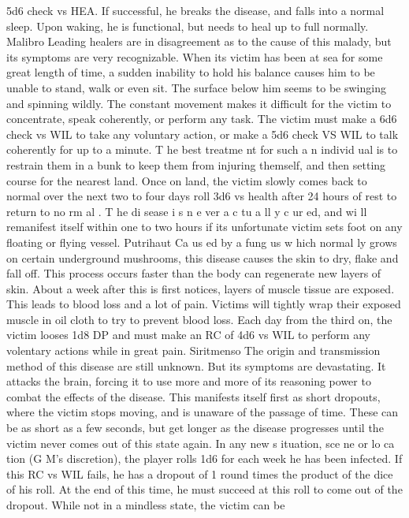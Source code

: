 \begin{multicols*}{2}
5d6 check vs HEA. If successful, he breaks the disease, and
falls into a normal sleep. Upon waking, he is functional, but
needs to heal up to full normally.
Malibro
Leading healers are in disagreement as to the cause
of this malady, but its symptoms are very recognizable. When
its victim has been at sea for some great length of time, a
sudden inability to hold his balance causes him to be unable
to stand, walk or even sit. The surface below him seems to be
swinging and spinning wildly. The constant movement makes
it difficult for the victim to concentrate, speak coherently, or
perform any task. The victim must make a 6d6 check vs WIL
to take any voluntary action, or make a 5d6 check VS WIL to
talk coherently for up to a minute.
T he best treatme nt for such a n individ ual is to
restrain them in a bunk to keep them from injuring themself,
and then setting course for the nearest land. Once on land, the
victim slowly comes back to normal over the next two to four
days roll 3d6 vs health after 24 hours of rest to return to
no rm al . T he di sease i s n e ver a c tu a ll y c ur ed, and wi ll
remanifest itself within one to two hours if its unfortunate
victim sets foot on any floating or flying vessel.
Putrihaut
Ca us ed by a fung us w hich normal ly grows on
certain underground mushrooms, this disease causes the skin
to dry, flake and fall off. This process occurs faster than the
body can regenerate new layers of skin. About a week after
this is first notices, layers of muscle tissue are exposed. This
leads to blood loss and a lot of pain. Victims will tightly wrap
their exposed muscle in oil cloth to try to prevent blood loss.
Each day from the third on, the victim looses 1d8 DP and
must make an RC of 4d6 vs WIL to perform any volentary
actions while in great pain.
Siritmenso
The origin and transmission method of this disease
are still unknown. But its symptoms are devastating. It attacks
the brain, forcing it to use more and more of its reasoning
power to combat the effects of the disease. This manifests
itself first as short dropouts, where the victim stops moving,
and is unaware of the passage of time. These can be as short
as a few seconds, but get longer as the disease progresses
until the victim never comes out of this state again.
In any new s ituation, sce ne or lo ca tion (G M’s
discretion), the player rolls 1d6 for each week he has been
infected. If this RC vs WIL fails, he has a dropout of 1 round
times the product of the dice of his roll. At the end of this
time, he must succeed at this roll to come out of the dropout.
While not in a mindless state, the victim can be

\end{multicols*}
